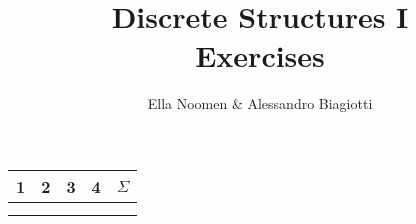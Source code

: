 \documentclass{article}
\title{Discrete Structures I \\ Exercises}
\author{Ella Noomen \& Alessandro Biagiotti}
\date{}
\begin{document}
\maketitle
\begin{center}
    \begin{tabular}{|c|c|c|c|c|}
        \hline
        1 & 2 & 3 & 4 & $\Sigma$ \\
        \hline
        & & & & \\
        & & & & \\
        \hline
    \end{tabular}
\end{center}













\end{document}
